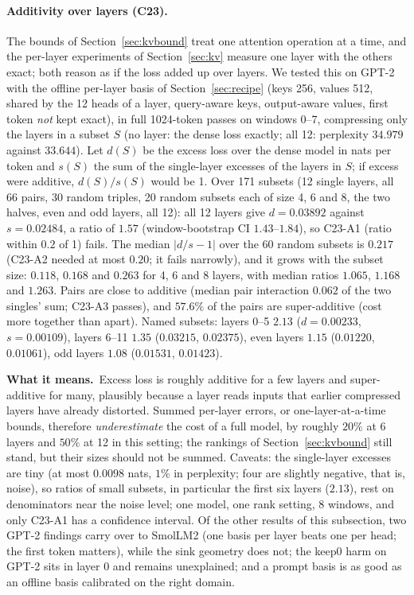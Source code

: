 \documentclass[10pt]{article}
\theoremstyle{plain}
\theoremstyle{definition}
\theoremstyle{remark}
\newcommand{\means}{\noindent\textbf{What it means.}\ }
\newcommand{\rl}[1]{\textsf{#1}}%
\begin{document}
\paragraph{Additivity over layers (C23).} The bounds of Section~\ref{sec:kvbound} treat one attention operation at a time, and the per-layer experiments of Section~\ref{sec:kv} measure one layer with the others exact; both reason as if the loss added up over layers. We tested this on GPT-2 with the offline per-layer basis of Section~\ref{sec:recipe} (keys 256, values 512, shared by the 12 heads of a layer, query-aware keys, output-aware values, first token \emph{not} kept exact), in full 1024-token passes on windows 0--7, compressing only the layers in a subset $S$ (no layer: the dense loss exactly; all 12: perplexity $34.979$ against $33.644$). Let $d(S)$ be the excess loss over the dense model in nats per token and $s(S)$ the sum of the single-layer excesses of the layers in $S$; if excess were additive, $d(S)/s(S)$ would be 1. Over 171 subsets (12 single layers, all 66 pairs, 30 random triples, 20 random subsets each of size 4, 6 and 8, the two halves, even and odd layers, all 12): all 12 layers give $d=0.03892$ against $s=0.02484$, a ratio of $1.57$ (window-bootstrap CI $1.43$--$1.84$), so \rl{C23-A1} (ratio within $0.2$ of 1) fails. The median $|d/s-1|$ over the 60 random subsets is $0.217$ (\rl{C23-A2} needed at most $0.20$; it fails narrowly), and it grows with the subset size: $0.118$, $0.168$ and $0.263$ for 4, 6 and 8 layers, with median ratios $1.065$, $1.168$ and $1.263$. Pairs are close to additive (median pair interaction $0.062$ of the two singles' sum; \rl{C23-A3} passes), and $57.6\%$ of the pairs are super-additive (cost more together than apart). Named subsets: layers 0--5 $2.13$ ($d=0.00233$, $s=0.00109$), layers 6--11 $1.35$ ($0.03215$, $0.02375$), even layers $1.15$ ($0.01220$, $0.01061$), odd layers $1.08$ ($0.01531$, $0.01423$).

\means Excess loss is roughly additive for a few layers and super-additive for many, plausibly because a layer reads inputs that earlier compressed layers have already distorted. Summed per-layer errors, or one-layer-at-a-time bounds, therefore \emph{underestimate} the cost of a full model, by roughly $20\%$ at 6 layers and $50\%$ at 12 in this setting; the rankings of Section~\ref{sec:kvbound} still stand, but their sizes should not be summed. Caveats: the single-layer excesses are tiny (at most $0.0098$ nats, $1\%$ in perplexity; four are slightly negative, that is, noise), so ratios of small subsets, in particular the first six layers ($2.13$), rest on denominators near the noise level; one model, one rank setting, 8 windows, and only \rl{C23-A1} has a confidence interval. Of the other results of this subsection, two GPT-2 findings carry over to SmolLM2 (one basis per layer beats one per head; the first token matters), while the sink geometry does not; the keep0 harm on GPT-2 sits in layer 0 and remains unexplained; and a prompt basis is as good as an offline basis calibrated on the right domain.
\end{document}
